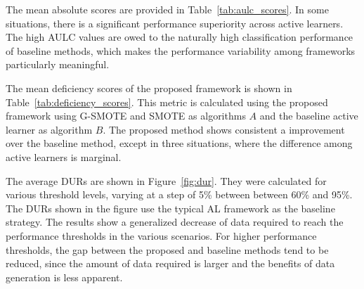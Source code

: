 \documentclass[parskip=full]{scrartcl}
\begin{document}

The mean absolute scores are provided in Table~\ref{tab:aulc_scores}. In some
situations, there is a significant performance superiority across active
learners. The high AULC values are owed to the naturally high classification
performance of baseline methods, which makes the performance variability among
frameworks particularly meaningful. 


The mean deficiency scores of the proposed framework is shown in
Table~\ref{tab:deficiency_scores}. This metric is calculated using the proposed
framework using G-SMOTE and SMOTE as algorithms $A$ and the baseline active
learner as algorithm $B$. The proposed method shows consistent a improvement
over the baseline method, except in three situations, where the difference among
active learners is marginal.


The average DURs are shown in Figure~\ref{fig:dur}. They were calculated for
various threshold levels, varying at a step of 5\% between between 60\% and
95\%. The DURs shown in the figure use the typical AL framework as the baseline
strategy. The results show a generalized decrease of data required to reach the
performance thresholds in the various scenarios. For higher performance
thresholds, the gap between the proposed and baseline methods tend to be
reduced, since the amount of data required is larger and the benefits of data
generation is less apparent.
\end{document}
